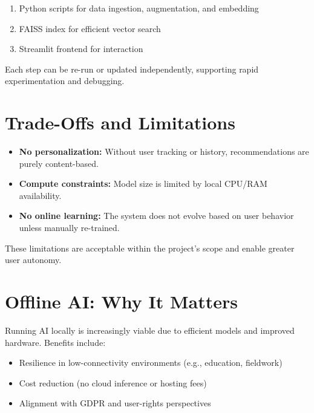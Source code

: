 \begin{enumerate}
    \item Python scripts for data ingestion, augmentation, and embedding
    \item FAISS index for efficient vector search
    \item Streamlit frontend for interaction
\end{enumerate}

Each step can be re-run or updated independently, supporting rapid experimentation and debugging.

\section{Trade-Offs and Limitations}
\begin{itemize}
    \item \textbf{No personalization:} Without user tracking or history, recommendations are purely content-based.
    \item \textbf{Compute constraints:} Model size is limited by local CPU/RAM availability.
    \item \textbf{No online learning:} The system does not evolve based on user behavior unless manually re-trained.
\end{itemize}

These limitations are acceptable within the project’s scope and enable greater user autonomy.

\section{Offline AI: Why It Matters}
Running AI locally is increasingly viable due to efficient models and improved hardware. Benefits include:

\begin{itemize}
    \item Resilience in low-connectivity environments (e.g., education, fieldwork)
    \item Cost reduction (no cloud inference or hosting fees)
    \item Alignment with GDPR and user-rights perspectives
\end{itemize}

